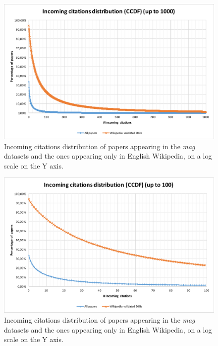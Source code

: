 \begin{figure}[ht]
    \centering
    \includegraphics[keepaspectratio=true, width=\textwidth]{assets/incoming_cits_ccdf_1000}
    \caption{Incoming citations distribution of papers appearing in the \emph{mag} datasets and the ones appearing only in English Wikipedia, on a log scale on the Y axis.}
    \label{fig:incoming_citations_ccdf_1000}
\end{figure}

\begin{figure}[ht]
    \centering
    \includegraphics[keepaspectratio=true, width=\textwidth]{assets/incoming_cits_ccdf_100}
    \caption{Incoming citations distribution of papers appearing in the \emph{mag} datasets and the ones appearing only in English Wikipedia, on a log scale on the Y axis.}
    \label{fig:incoming_citations_ccdf_100}
\end{figure}



